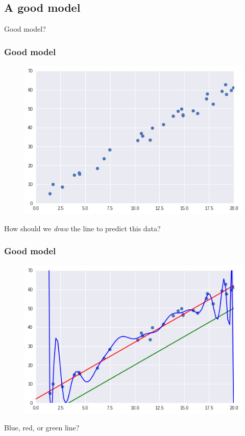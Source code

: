 \documentclass[]{beamer}
\begin{document}
\subsection{A good model}
\begin{frame}
\begin{center}
{\Huge Good model?}\\
\end{center}
\end{frame}

\begin{frame}
\frametitle{Good model}
\begin{figure}
\includegraphics[scale=.4]{imgs/linreg_1.png}
\end{figure}
\begin{center}
How should we \textit{draw} the line to predict this data?
\end{center}
\end{frame}

\begin{frame}
\frametitle{Good model}
\begin{figure}
\includegraphics[scale=.4]{imgs/linreg_2.png}
\end{figure}
\begin{center}
Blue, red, or green line?
\end{center}
\end{frame}
\end{document}
